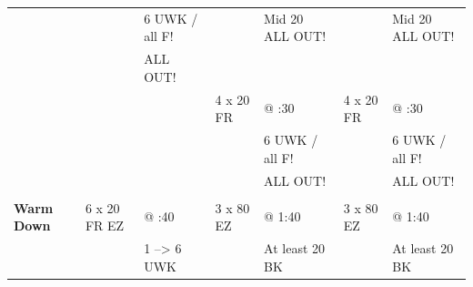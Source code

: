 \documentclass[11pt]{article}
\begin{document}
\begin{tabular}{|L{1.5cm}|L{2.5cm}L{1.8cm}|L{2.5cm}L{1.8cm}|L{2.5cm}L{1.8cm}|}
&  & 6 UWK / all F! &  & Mid 20 ALL OUT! &  & Mid 20 ALL OUT! \\
&  & ALL OUT! &  &  &  &  \\
&  &  & 4 x 20 FR & @ :30 & 4 x 20 FR & @ :30 \\
&  &  &  & 6 UWK / all F! &  & 6 UWK / all F! \\
&  &  &  & ALL OUT! &  & ALL OUT! \\
&  &  &  &  &  &  \\
\textbf{Warm Down} & 6 x 20 FR EZ & @ :40 & 3 x 80 EZ & @ 1:40 & 3 x 80 EZ & @ 1:40 \\
\hline
&  & 1 --> 6 UWK &  & At least 20 BK &  & At least 20 BK \\

\end{tabular}
\end{document}
